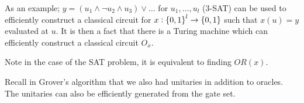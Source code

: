 As an example; $y = (u_1 \land \lnot u_2 \land u_3) \lor \ldots$ for $u_1, \ldots, u_l$ (3-SAT) can be used to efficiently construct a classical circuit for $x: \set{0, 1}^l \to \set{0, 1}$ such that $x(u) = y$ evaluated at $u$. It is then a fact that there is a Turing machine which can efficiently construct a classical circuit $O_x$. 

Note in the case of the SAT problem, it is equivalent to finding $OR(x)$. 

Recall in Grover's algorithm that we also had unitaries in addition to oracles. The unitaries can also be efficiently generated from the gate set.